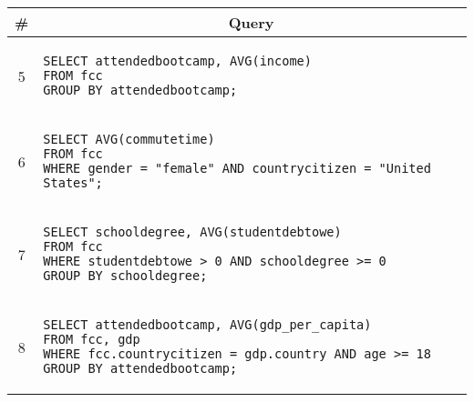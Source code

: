 \begin{tabular}{cl}
\toprule
\# & \multicolumn{1}{c}{Query} \\
\midrule
5 & 
\begin{minipage}{6in}
\begin{lstlisting}[breaklines]
SELECT attendedbootcamp, AVG(income)
FROM fcc
GROUP BY attendedbootcamp;
\end{lstlisting}
\end{minipage}{queryno} \label[query]{q5} \\
6 & 
\begin{minipage}{6in}
\begin{lstlisting}[breaklines]
SELECT AVG(commutetime)
FROM fcc
WHERE gender = "female" AND countrycitizen = "United States";
\end{lstlisting}
\end{minipage}{queryno} \label[query]{q6} \\
7 & 
\begin{minipage}{6in}
\begin{lstlisting}[breaklines]
SELECT schooldegree, AVG(studentdebtowe)
FROM fcc
WHERE studentdebtowe > 0 AND schooldegree >= 0
GROUP BY schooldegree;
\end{lstlisting}
\end{minipage}{queryno} \label[query]{q7}\\
8 & 
\begin{minipage}{6in}
\begin{lstlisting}[breaklines]
SELECT attendedbootcamp, AVG(gdp_per_capita)
FROM fcc, gdp
WHERE fcc.countrycitizen = gdp.country AND age >= 18
GROUP BY attendedbootcamp;
\end{lstlisting}
\end{minipage}{queryno} \label[query]{q8}\\
\bottomrule
\end{tabular}
